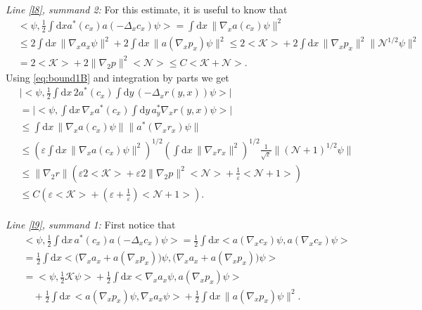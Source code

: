 \documentclass[11pt,a4paper,draft,DIV11]{scrartcl}	%
\newcommand{\di}{\textrm{d}}		%
\newcommand{\Ncal}{\mathcal{N}}		%
\newcommand{\Kcal}{\mathcal{K}}		%
\newcommand{\estlist}[2]{\emph{\vspace{.3em}\\Line \ref{l#1}, summand #2:}}
\newcommand{\scal}[2]{\big<#1,#2\big>} %
\newcommand{\norm}[1]{\lVert#1\rVert}	%
\newcommand{\ev}[1]{\big<#1\big>}	%
\newcommand{\gradone}{\nabla_2}
\begin{document}
\begin{fleqn}[0.5em]
\estlist{8}{2}
For this estimate, it is useful to know that
\begin{equation} \label{eq:bound1B}                                     
\begin{split}
 & \scal{\psi}{\frac{1}{2}\int \di x a^\ast(c_x) a(-\Delta_x c_x)\psi} = \int \di x\, \norm{\nabla_x a(c_x)\psi}^2 \\
 & \leq 2 \int \di x\, \norm{\nabla_x a_x \psi}^2 + 2\int \di x\, \norm{a(\nabla_x p_x)\psi}^2 \leq 2\ev{\Kcal} + 2\int \di x\, \norm{\nabla_x p_x}^2 \norm{\Ncal^{1/2}\psi}^2 \\
 & = 2\ev{\Kcal}+ 2\norm{\gradone p}^2 \ev{\Ncal} \leq C\ev{\Kcal + \Ncal}.
\end{split}
\end{equation}
Using \eqref{eq:bound1B} and integration by parts we get
\begin{align*}
& \lvert \scal{\psi}{\frac{1}{2}\int \di x\, 2a^\ast(c_x) \int \di y\, (-\Delta_x r(y,x))\psi} \rvert \\
& = \lvert \scal{\psi}{\int \di x\, \nabla_x a^\ast(c_x) \int \di y\, a^\ast_y \nabla_x r(y,x) \psi}\rvert \\
& \leq \int \di x\, \norm{\nabla_x a(c_x)\psi} \norm{a^\ast(\nabla_x r_x)\psi} \\
& \leq \left( \varepsilon \int \di x\, \norm{\nabla_x a(c_x) \psi}^2 \right)^{1/2} \left( \int \di x\, \norm{\nabla_x r_x}^2 \right)^{1/2} \frac{1}{\sqrt{\varepsilon}} \norm{(\Ncal+1)^{1/2}\psi} \\
& \leq \norm{\gradone r} \left( \varepsilon 2\ev{\Kcal} + \varepsilon 2 \norm{\gradone p}^2 \ev{\Ncal} + \frac{1}{\varepsilon}\ev{\Ncal+1} \right) \\
& \leq C \left( \varepsilon \ev{\Kcal} + (\varepsilon+\frac{1}{\varepsilon})\ev{\Ncal+1} \right).
\end{align*}
\estlist{9}{1}
First notice that
\begin{align*}
 & \scal{\psi}{\frac{1}{2}\int \di x\, a^\ast(c_x) a(-\Delta_x c_x)\psi} = \frac{1}{2}\int \di x \scal{a(\nabla_x c_x)\psi}{a(\nabla_x c_x)\psi} \\
& = \frac{1}{2}\int \di x \scal{\big( \nabla_x a_x + a(\nabla_x p_x) \big)\psi}{\big(  \nabla_x a_x + a(\nabla_x p_x) \big) \psi} \\
& = \scal{\psi}{\frac{1}{2}\Kcal \psi} + \frac{1}{2}\int \di x\scal{\nabla_x
a_x \psi}{a(\nabla_x p_x)\psi} \\
& \quad + \frac{1}{2}\int \di x\, \scal{a(\nabla_x p_x)\psi}{\nabla_x a_x \psi} + \frac{1}{2}\int \di x\, \norm{a(\nabla_x p_x)\psi}^2.

\end{align*}
\end{fleqn}
\end{document}
